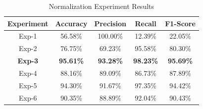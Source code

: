 \documentclass[conference]{IEEEtran}
\begin{document}
\begin{table}[H]
\centering
\caption{Comparison of Data Before and After Normalization}
\label{tab:normalization_comparison}
\end{table}

\begin{table}[H]
\caption{Normalization Experiment Results}
\centering
\begin{tabular}{|c|c|c|c|c|}
\hline
\textbf{Experiment} & \textbf{Accuracy} & \textbf{Precision} & \textbf{Recall} & \textbf{F1-Score} \\
\hline
Exp-1  & 56.58\% & 100.00\% & 12.39\% & 22.05\% \\
\hline
Exp-2  & 76.75\% & 69.23\% & 95.58\% & 80.30\% \\
\hline
\rowcolor{blue!15}
\textbf{Exp-3 } & \textbf{95.61\%} & \textbf{93.28\%} & \textbf{98.23\%} & \textbf{95.69\%} \\
\hline
Exp-4  & 88.16\% & 89.09\% & 86.73\% & 87.89\% \\
\hline
Exp-5  & 94.30\% & 91.67\% & 97.35\% & 94.42\% \\
\hline
Exp-6  & 90.35\% & 88.89\% & 92.04\% & 90.43\% \\
\hline
\end{tabular}
\label{tab_experiment}
\end{table}
\end{document}

